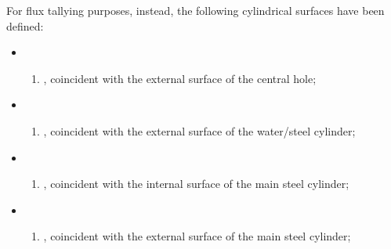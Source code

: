 \documentclass[letterpaper,10pt,english]{sphinxmanual}
\begin{document}
\sphinxAtStartPar
For flux tallying purposes, instead, the following cylindrical surfaces have been defined:
\begin{itemize}
\item {} \begin{enumerate}
%
\setcounter{enumi}{13}
\item {} 
, coincident with the external surface of the central hole;

\end{enumerate}

\item {} \begin{enumerate}
%
\setcounter{enumi}{13}
\item {} 
, coincident with the external surface of the water/steel cylinder;

\end{enumerate}

\item {} \begin{enumerate}
%
\setcounter{enumi}{13}
\item {} 
, coincident with the internal surface of the main steel cylinder;

\end{enumerate}

\item {} \begin{enumerate}
%
\setcounter{enumi}{13}
\item {} 
, coincident with the external surface of the main steel cylinder;

\end{enumerate}

\end{itemize}
\end{document}
